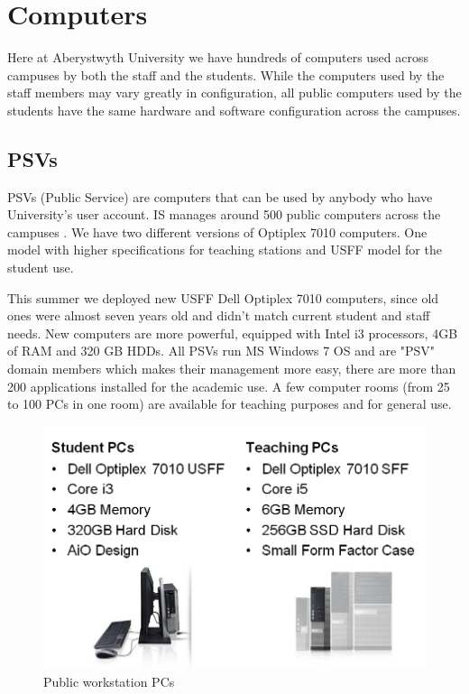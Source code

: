 \documentclass[10pt,a4paper,headinclude=true,twoside]{report}
\begin{document}
\section{Computers}
Here at Aberystwyth University we have hundreds of computers used across campuses by both the staff and the students. While the computers used by the staff members may vary greatly in configuration, all public computers used by the students have the same hardware and software configuration across the campuses.
\subsection{PSVs}
PSVs (Public Service) are computers that can be used by anybody who have University's user account. IS manages around 500 public computers across the campuses \cite{PSVs2}. We have two different versions of Optiplex 7010 computers. One model with higher specifications for teaching stations and USFF model for the student use. 

This summer we deployed new USFF Dell Optiplex 7010 \cite{PSVs} computers, since old ones were almost seven years old and didn't match current student and staff needs. New computers are more powerful, equipped with Intel i3 processors, 4GB of RAM and 320 GB HDDs. All PSVs run MS Windows 7 OS and are "PSV" domain members which makes their management more easy, there are more than 200 applications installed for the academic use. A few computer rooms (from 25 to 100 PCs in one room) are available for teaching purposes and for general use.
\begin{figure}[H]
\centering
\centerline{\includegraphics[scale=0.5]{./PSVs}}
\caption{Public workstation PCs \cite{PSVs}}
\label{fig:PSVs}
\end{figure}
\end{document}
